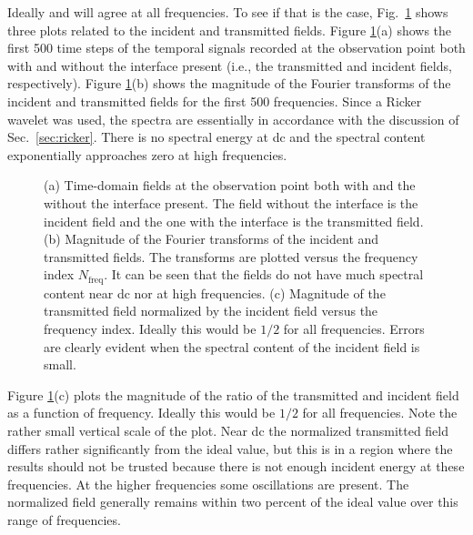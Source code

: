 Ideally  and  will agree at
all frequencies.  To see if that is the case, Fig.\
\ref{fig:incTransFields} shows three plots related to the incident and
transmitted fields.  Figure \ref{fig:incTransFields}(a) shows the
first 500 time steps of the temporal signals recorded at the
observation point both with and without the interface present
(i.e., the transmitted and incident fields, respectively).  Figure
\ref{fig:incTransFields}(b) shows the magnitude of the Fourier
transforms of the incident and transmitted fields for the first 500
frequencies.  Since a Ricker wavelet was used, the spectra are
essentially in accordance with the discussion of Sec.\
\ref{sec:ricker}.  There is no spectral energy at dc and the spectral
content exponentially approaches zero at high frequencies.

\begin{figure}
  \begin{center}
  \end{center}

  \caption{(a) Time-domain fields at the observation point both with
   and the without the interface present.  The field without the
   interface is the incident field and the one with the interface is
   the transmitted field.  (b) Magnitude of the Fourier transforms of
   the incident and transmitted fields.  The transforms are plotted
   versus the frequency index $N_{\mathrm{freq}}$.  It can be seen that
   the fields do not have much spectral content near dc nor at high
   frequencies.  (c) Magnitude of the transmitted field normalized by
   the incident field versus the frequency index.  Ideally this would
   be $1/2$ for all frequencies.  Errors are clearly evident when the
   spectral content of the incident field is small.}
   \label{fig:incTransFields}
\end{figure}

Figure \ref{fig:incTransFields}(c) plots the magnitude of the ratio of
the transmitted and incident field as a function of frequency.
Ideally this would be $1/2$ for all frequencies.  Note the rather
small vertical scale of the plot.  Near dc the normalized transmitted
field differs rather significantly from the ideal value, but this is
in a region where the results should not be trusted because there is
not enough incident energy at these frequencies.  At the higher
frequencies some oscillations are present.  The normalized field
generally remains within two percent of the ideal value over this
range of frequencies.

